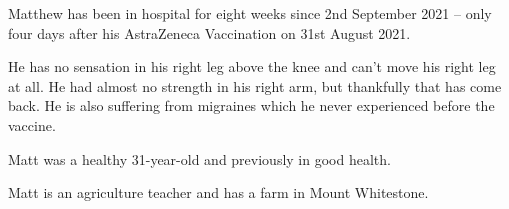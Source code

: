 Matthew has been in hospital for eight weeks since 2nd September 2021 – only
four days after his AstraZeneca Vaccination on 31st August 2021.

He has no sensation in his right leg above the knee and can’t move his right leg
at all. He had almost no strength in his right arm, but thankfully that has come
back. He is also suffering from migraines which he never experienced before the
vaccine.

Matt was a healthy 31-year-old and previously in good health.

Matt is an agriculture teacher and has a farm in Mount Whitestone.


